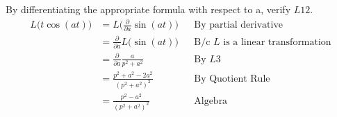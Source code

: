 \item [4.] By differentiating the appropriate formula with respect to a, verify $L12$.
\begin{align*}
    L\big(t\cos(at)\big) &= L \Big(\frac{\partial}{\partial a} \sin(at)\Big) && \text{By partial derivative} \\\
    &= \frac{\partial}{\partial a} L\big(\sin(at)\big) && \text{B/c $L$ is a linear transformation}\\
    &=\frac{\partial}{\partial a} \frac{a}{p^2+a^2} &&\text{By } L3\\
    &=\frac{p^2+a^2-2a^2}{(p^2+a^2)^2} &&\text{By Quotient Rule}\\
    &=\frac{p^2-a^2}{(p^2+a^2)^2} &&\text{Algebra}\\
\end{align*}